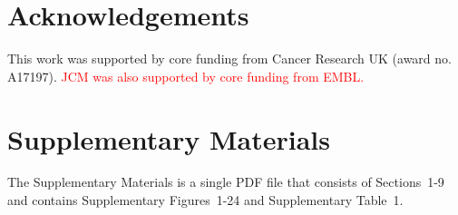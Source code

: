 \documentclass{article}
\newcommand\revised[1]{\textcolor{red}{#1}}
\newcommand{\suppsecclust}{9}
\newcommand{\suppfigclusterreal}{24}
\begin{document}
\section{Acknowledgements}
This work was supported by core funding from Cancer Research UK (award no. A17197).
\revised{JCM was also supported by core funding from EMBL.}

\section{Supplementary Materials}
The Supplementary Materials is a single PDF file that consists of Sections~1-\suppsecclust{} and contains Supplementary Figures~1-\suppfigclusterreal{} and Supplementary Table~1.



\end{document}
